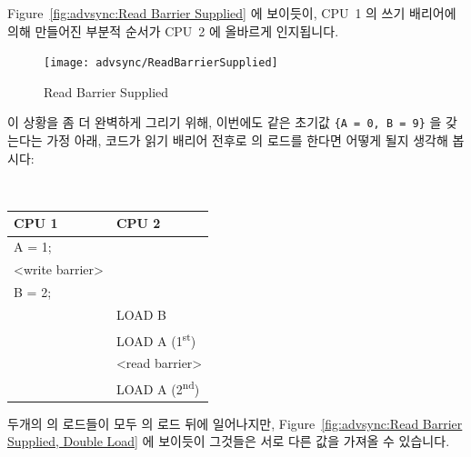 \begin{enumerate}
Figure~\ref{fig:advsync:Read Barrier Supplied} 에 보이듯이, CPU~1 의 쓰기
배리어에 의해 만들어진 부분적 순서가 CPU~2 에 올바르게 인지됩니다.

\begin{figure}[htb]
\begin{center}
\texttt{[image: advsync/ReadBarrierSupplied]}
\end{center}
\caption{Read Barrier Supplied}
\end{figure}

이 상황을 좀 더 완벽하게 그리기 위해, 이번에도 같은 초기값 {\tt \{A = 0, B =
9\}} 을 갖는다는 가정 아래, 코드가 읽기 배리어 전후로  의 로드를 한다면
어떻게 될지 생각해 봅시다:

\vspace{5pt}
\begin{minipage}[t]{\columnwidth}
\tt
\scriptsize
\begin{tabular}{l|p{1.5in}}
	CPU 1 &		CPU 2 \\
	\hline
	A = 1; & \\
	<write barrier> & \\
	B = 2; & \\
		&	LOAD B \\
		&	LOAD A (1\textsuperscript{st}) \\
		&	<read barrier> \\
		&	LOAD A (2\textsuperscript{nd}) \\
\end{tabular}
\end{minipage}
\vspace{5pt}

두개의  의 로드들이 모두  의 로드 뒤에 일어나지만,
Figure~\ref{fig:advsync:Read Barrier Supplied, Double Load} 에 보이듯이
그것들은 서로 다른 값을 가져올 수 있습니다.

\end{enumerate}
